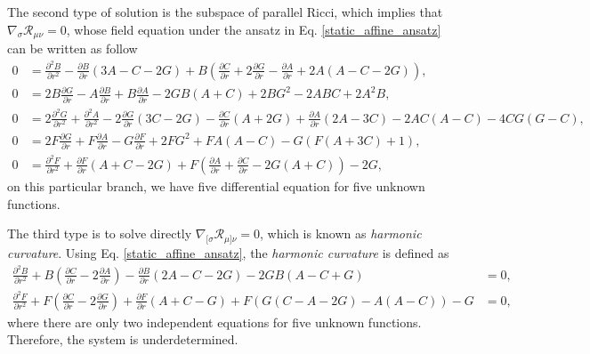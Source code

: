 \documentclass{article}
\begin{document}
The second type of solution is the subspace of parallel Ricci, which
implies that $\nabla_{\sigma}\mathcal{R}_{\mu\nu} = 0$, whose field 
equation under the ansatz in Eq. \eqref{static_affine_ansatz} can be
written as follow
\begin{align}
    0 & = \frac{\partial^2 B}{\partial r^2}  - \frac{\partial B}{\partial r}\left(3A - C - 2G\right) + B\left(\frac{\partial C}{\partial r} + 2\frac{\partial G}{\partial r} - \frac{\partial A}{\partial r} + 2A\left(A - C - 2G\right)\right),  \\
    0 & = 2B\frac{\partial G}{\partial r} - A\frac{\partial B}{\partial r} + B\frac{\partial A}{\partial r} - 2GB\left(A + C\right) + 2BG^2 - 2ABC + 2A^2B ,  \\
    0 & = 2\frac{\partial^2 G}{\partial r^2} + \frac{\partial^2 A}{\partial r^2} - 2\frac{\partial G}{\partial r}\left(3C - 2G\right) - \frac{\partial C}{\partial r}\left(A + 2G \right) + \frac{\partial A}{\partial r}\left(2A - 3C\right) - 2AC\left(A - C\right) - 4CG\left(G - C\right) ,\\
    0 & = 2F\frac{\partial G}{\partial r} + F \frac{\partial A}{\partial r} - G\frac{\partial F}{\partial r} + 2FG^2 + FA\left(A - C\right) - G\left(F\left(A + 3C\right) + 1\right), \\
    0 & = \frac{\partial^ 2 F}{\partial r^2} + \frac{\partial F}{\partial r}\left(A + C - 2G\right) + F\left(\frac{\partial A}{\partial r} + \frac{\partial C}{\partial r} - 2G\left(A + C\right)\right) - 2G ,
\end{align}
on this particular branch, we have five differential equation for five 
unknown functions. 

The third type is to solve directly $\nabla_{[\sigma}\mathcal{R}_{\mu]\nu} = 0$,
which is known as \textit{harmonic curvature}. Using Eq. \eqref{static_affine_ansatz}, 
the \textit{harmonic curvature} is defined as
\begin{align}
    \frac{\partial^2 B}{\partial r^2} + B\left(\frac{\partial C}{\partial r} -2\frac{\partial A}{\partial r}\right) - \frac{\partial B}{\partial r}\left(2A - C - 2G\right)  - 2GB\left(A - C + G\right)  & = 0, \\
    \frac{\partial^2 F}{\partial r^2}  + F\left(\frac{\partial C}{\partial r} - 2\frac{\partial G}{\partial r}\right) + \frac{\partial F}{\partial r}\left(A + C - G\right) +
    F\left(G \left(C - A -2G\right) - A\left(A - C\right)\right) - G & = 0,
\end{align}
where there are only two independent equations for five unknown 
functions. Therefore, the system is underdetermined.
\end{document}
